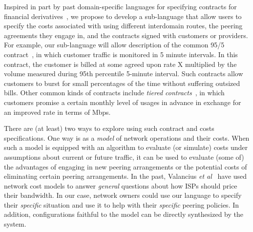 
Inspired in part by past domain-specific languages for specifying contracts for financial derivatives~\cite{spj+:contracts},
we propose to develop a sub-language that allow users to specify the
costs associated with using different interdomain routes, the peering agreements they
engage in, and the contracts signed with customers or providers.  For example,
our sub-language will allow description of the common 95/5 contract~\cite{routingplaybook}, in which 
customer traffic is monitored in
5 minute intervals.  In this contract, the customer is billed at some agreed upon rate X multiplied by the
volume measured during 95th percentile 5-minute interval.  Such contracts allow customers to burst for small
percentages of the time without suffering outsized bills.  Other common kinds of contracts include
\emph{tiered contracts}~\cite{tiered-isp-contracts}, in which customers promise a certain monthly level
of usages in advance in exchange for an improved rate in terms of Mbps.  

There are (at least) two ways to explore using such contract and costs specifications.  One way is as a \emph{model}
of network operations and their costs.  When such a model is equipped with an algorithm to evaluate (or simulate) costs under
assumptions about current or future traffic, it can be used to evaluate (some of) the advantages of engaging
in new peering arrangements or the potential costs of eliminating certain peering arrangements.  
In the past, Valancius \emph{et al}~\cite{tiered-isp-contracts} have used network cost models to 
answer \emph{general} questions about how ISPs should price their bandwidth.  In our case, network owners could
use our language to specify their \emph{specific} situation and use it to help with their \emph{specific} peering
policies.  In addition, configurations faithful to the model can be directly synthesized by the \Name system.  

